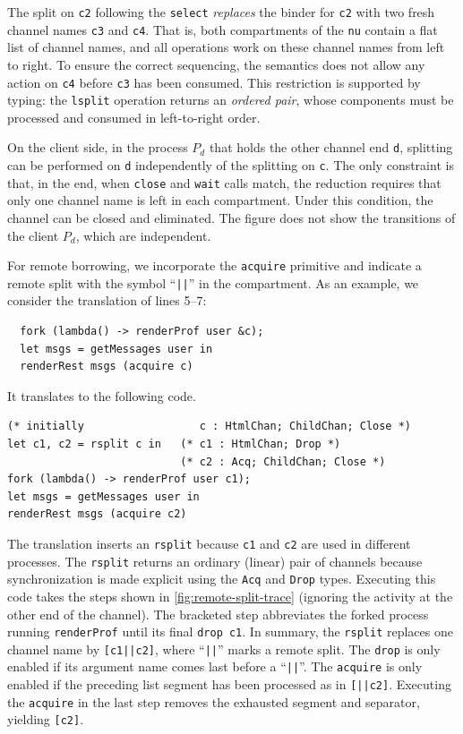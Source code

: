 The split on \lstinline{c2} following the \lstinline{select} \emph{replaces} the
binder for \lstinline{c2} with two fresh channel names \lstinline{c3}
and \lstinline{c4}. That is, both compartments of the \lstinline{nu}
contain a flat list of channel names, and all operations work on these
channel names from left to right. To ensure the correct
sequencing, the semantics does not allow any action on \lstinline{c4} before
\lstinline{c3} has been consumed. This restriction is supported by
typing: the \lstinline{lsplit} operation returns an \emph{ordered
  pair}, whose components must be processed and consumed in
left-to-right order.

On the client side, in the process $P_d$ that holds the other
channel end \lstinline{d}, 
splitting can be performed on \lstinline{d} independently of
the splitting on \lstinline{c}. The only constraint is that, in the
end, when \lstinline{close} and \lstinline{wait} calls match, the
reduction requires that only one channel name is left in each
compartment. Under this condition, the channel can be closed and
eliminated. The figure does not show the transitions of the client $P_d$, which
are independent.

For remote borrowing, we incorporate the 
\lstinline{acquire} primitive and indicate a remote split with the
symbol ``\lstinline{||}'' in the compartment. As an example, we consider the translation of
lines 5--7:
\begin{lstlisting}
  fork (lambda() -> renderProf user &c);
  let msgs = getMessages user in
  renderRest msgs (acquire c)
\end{lstlisting}
It translates to the following \thecalculus code.
\begin{lstlisting}
(* initially                  c : HtmlChan; ChildChan; Close *)
let c1, c2 = rsplit c in   (* c1 : HtmlChan; Drop *)
                           (* c2 : Acq; ChildChan; Close *)
fork (lambda() -> renderProf user c1);
let msgs = getMessages user in
renderRest msgs (acquire c2)
\end{lstlisting}
The translation inserts an \lstinline{rsplit} because \lstinline{c1}
and \lstinline{c2} are used in different processes. The
\lstinline{rsplit} returns an ordinary (linear) pair of channels
because synchronization is made explicit using the \lstinline{Acq} and
\lstinline{Drop} types.
Executing this code takes the steps shown  in
\cref{fig:remote-split-trace}  (ignoring the activity 
at the other end of the channel). The bracketed step abbreviates the
forked process running \lstinline{renderProf} until its final
\lstinline{drop c1}.
In summary, the \lstinline{rsplit} replaces one channel name by
\lstinline{[c1||c2]}, where ``\lstinline{||}'' marks a remote split. The
\lstinline{drop} is only enabled 
if its argument name comes last before a ``\lstinline{||}''.
The \lstinline{acquire} is only enabled if the preceding list segment has
been processed as in \lstinline{[||c2]}. Executing the \lstinline{acquire}
in the last step removes the exhausted segment and separator, yielding
\lstinline{[c2]}.

